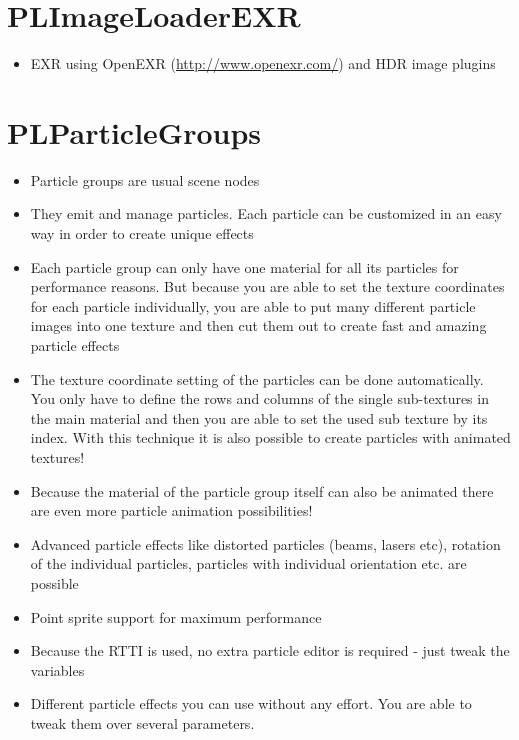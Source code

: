 \section{PLImageLoaderEXR}
\begin{itemize}
\item{EXR using OpenEXR (\url{http://www.openexr.com/}) and HDR image plugins}
\end{itemize}




\section{PLParticleGroups}
\begin{itemize}
\item{Particle groups are usual scene nodes}
\item{They emit and manage particles. Each particle can be customized in an easy way in order to create unique effects}
\item{Each particle group can only have one material for all its particles for performance reasons. But because you are able to set the texture coordinates for each particle individually, you are able to put many different particle images into one texture and then cut them out to create fast and amazing particle effects}
\item{The texture coordinate setting of the particles can be done automatically. You only have to define the rows and columns of the single sub-textures in the main material and then you are able to set the used sub texture by its index. With this technique it is also possible to create particles with animated textures!}
\item{Because the material of the particle group itself can also be animated there are even more particle animation possibilities!}
\item{Advanced particle effects like distorted particles (beams, lasers etc), rotation of the individual particles, particles with individual orientation etc. are possible}
\item{Point sprite support for maximum performance}
\item{Because the RTTI is used, no extra particle editor is required - just tweak the variables}
\item{Different particle effects you can use without any effort. You are able to tweak them over several parameters.}
\end{itemize}




